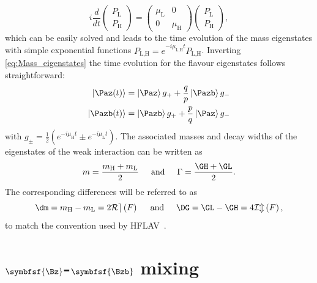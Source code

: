 \begin{equation}
i\frac{d}{dt}\begin{pmatrix} P_\text{L} \\ P_\text{H} \end{pmatrix} = \begin{pmatrix} \mu_\text{L} & 0 \\ 0 & \mu_\text{H} \end{pmatrix}\begin{pmatrix} P_\text{L} \\ P_\text{H} \end{pmatrix},
\end{equation}
which can be easily solved and leads to the time evolution of the mass eigenstates with simple exponential functions $P_\text{L,H}=e^{-i\mu_\text{L,H}t}P_\text{L,H}$.
Inverting \cref{eq:Mass_eigenstates} the time evolution for the flavour eigenstates follows straightforward:
\begin{equation}
\begin{split}
\left|\Paz\!\left(t\right)\right>&=\left|\Paz\right>g_++\frac{q}{p}\left|\Pazb\right>g_-\\
\left|\Pazb\!\left(t\right)\right>&=\left|\Pazb\right>g_++\frac{p}{q}\left|\Paz\right>g_- \label{eq:timeEvolution}
\end{split}
\end{equation}
with $g_\pm=\frac{1}{2}\left(e^{-i\mu_\text{H}t}\pm e^{-i\mu_\text{L}t}\right)$.
The associated masses and decay widths of the eigenstates of the weak interaction can be written as
\begin{equation}
m=\frac{m_\text{H}+m_\text{L}}{2}\hspace{0.5cm}\text{and}\hspace{0.5cm}\Gamma=\frac{\GH+\GL}{2}.
\end{equation}
The corresponding differences will be referred to as
\begin{equation}
\dm=m_\text{H}-m_\text{L}=2\mathcal{Re}\left(F\right)\hspace{0.5cm}\text{and}\hspace{0.5cm}\DG=\GL-\GH=4\mathcal{Im}\left(F\right),
\end{equation}
to match the convention used by \ac{HFLAV}~\cite{HFLAV2016}.

\section[head={\Bz-\Bzb mixing},tocentry={\Bz-\Bzb mixing}]{$\symbfsf{\Bz}$-$\symbfsf{\Bzb}$ mixing}
\label{sec:BBbarMixing}

